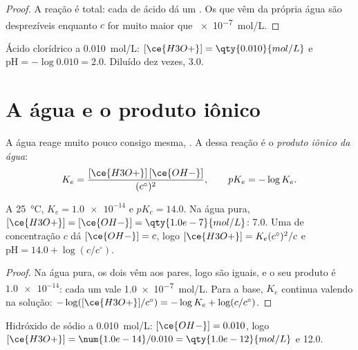 \begin{proof}
A reação  é total: cada  de ácido dá
um . Os  que vêm da própria água são desprezíveis enquanto
$c$ for muito maior que \qty{e-7}{mol/L}.
\end{proof}

\begin{example}\label{ex:g12:ka-and-pka:hcl}
Ácido clorídrico a \qty{0.010}{mol/L}: $[\ce{H3O+}] = \qty{0.010}{mol/L}$
e $\mathrm{pH} = -\log 0.010 = 2.0$. Diluído dez vezes,  3.0.
\end{example}

\section{A água e o produto iônico}


\begin{definition}\label{def:g12:ka-and-pka:ionic-product}
A água reage muito pouco consigo mesma, . A
 dessa reação é o \emph{produto iônico da
água}:
\[
  K_e = \frac{[\ce{H3O+}]\,[\ce{OH-}]}{(c^\circ)^2},
  \qquad pK_e = -\log K_e .
\]
\end{definition}

\begin{proposition}\label{prop:g12:ka-and-pka:ke}
A \qty{25}{\celsius}, $K_e = \num{1.0e-14}$ e $pK_e = 14.0$. Na água
pura, $[\ce{H3O+}] = [\ce{OH-}] = \qty{1.0e-7}{mol/L}$:  7.0. Uma  de concentração $c$ dá $[\ce{OH-}] = c$, logo
$[\ce{H3O+}] = K_e (c^\circ)^2 / c$ e $\mathrm{pH} = 14.0 + \log(c/c^\circ)$.
\end{proposition}

\begin{proof}
Na água pura, os dois  vêm aos pares, logo são iguais, e o seu
produto é $\num{1.0e-14}$: cada um vale \qty{1.0e-7}{mol/L}. Para a base,
$K_e$ continua valendo na solução:
$-\log([\ce{H3O+}]/c^\circ) = -\log K_e + \log(c/c^\circ)$.
\end{proof}

\begin{example}\label{ex:g12:ka-and-pka:naoh}
Hidróxido de sódio a \qty{0.010}{mol/L}: $[\ce{OH-}] = 0.010$, logo
$[\ce{H3O+}] = \num{1.0e-14}/0.010 = \qty{1.0e-12}{mol/L}$ e  12.0.
\end{example}

